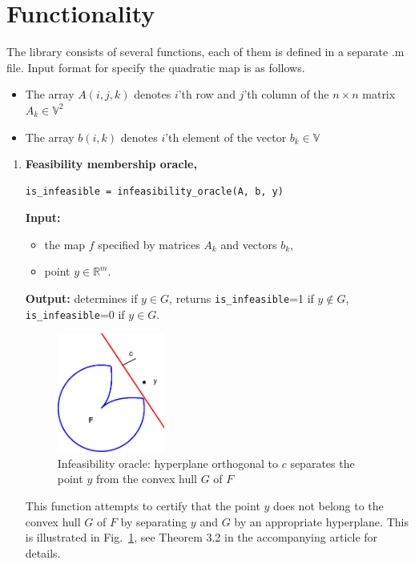 \documentclass[a4paper]{article}
\theoremstyle{definition}
\begin{document}
\newpage

\section*{Functionality}
The library consists of several functions, each of them is defined in a separate .m file.
Input format for specify the quadratic map is as follows.

\begin{itemize}
\item The array $A(i, j, k)$ denotes $i$'th row and $j$'th column of the $n\times n$ matrix $A_k\in\mathbb{V}^2$
\item The array $b(i, k)$ denotes $i$'th element of the vector $b_k\in\mathbb{V}$
\end{itemize}

\begin{enumerate}
\item {\bf Feasibility membership oracle,\hskip 6pt}
\begin{verbatim}
is_infeasible = infeasibility_oracle(A, b, y)
\end{verbatim}
{\bf Input:}
\begin{itemize}
\item the map $f$ specified by matrices $A_k$ and vectors $b_k$,
\item point $y\in\mathbb{R}^m$.
\end{itemize}
{\bf Output:} determines if $y\in G$, returns {\tt is\_infeasible}=1 if $y\notin G$, {\tt is\_infeasible}=0 if $y\in G$.

\begin{figure}[H]
	\centering\includegraphics[width=100pt]{fig/infeasibility_oracle}
	\caption{Infeasibility oracle: hyperplane orthogonal to $c$ separates the point $y$ from the convex hull $G$ of $F$}
\label{fig:one}
\end{figure}

This function attempts to certify that the point $y$ does not belong to the convex hull $G$ of $F$ by separating $y$ and $G$ by an appropriate hyperplane.
This is illustrated in Fig.~\ref{fig:one}, see Theorem 3.2 in the accompanying article for details.


\end{enumerate}
\end{document}
